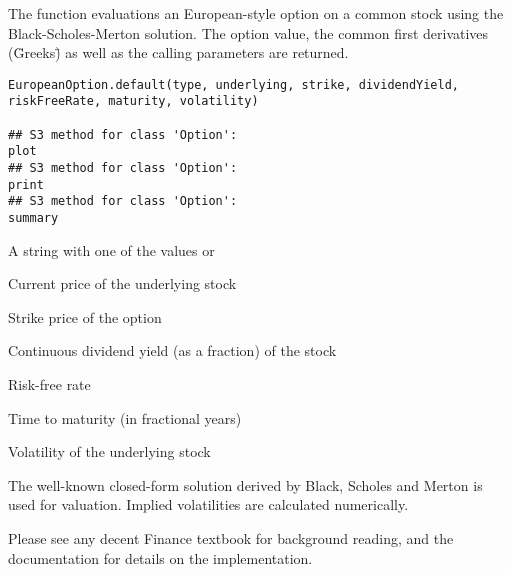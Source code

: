 \begin{Description}\relax
The  function evaluations an European-style
option on a common stock using the Black-Scholes-Merton solution. The
option value, the common first derivatives (\"Greeks\") as well as the
calling parameters are returned.
\end{Description}
\begin{Usage}
\begin{verbatim}
EuropeanOption.default(type, underlying, strike, dividendYield, riskFreeRate, maturity, volatility)

## S3 method for class 'Option':
plot
## S3 method for class 'Option':
print
## S3 method for class 'Option':
summary
\end{verbatim}
\end{Usage}
\begin{Arguments}
\begin{ldescription}
\item[\code{type}] A string with one of the values  or 
\item[\code{underlying}] Current price of the underlying stock
\item[\code{strike}] Strike price of the option
\item[\code{dividendYield}] Continuous dividend yield (as a fraction) of the stock
\item[\code{riskFreeRate}] Risk-free rate
\item[\code{maturity}] Time to maturity (in fractional years)
\item[\code{volatility}] Volatility of the underlying stock
\end{ldescription}
\end{Arguments}
\begin{Details}\relax
The well-known closed-form solution derived by Black, Scholes and
Merton is used for valuation. Implied volatilities are calculated
numerically.

Please see any decent Finance textbook for background reading, and the
 documentation for details on the 
implementation.
\end{Details}
